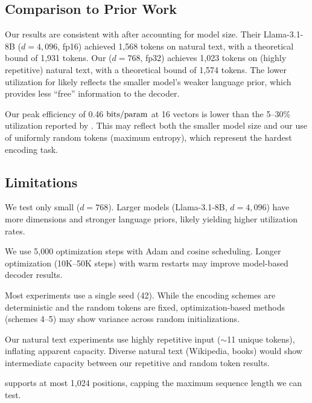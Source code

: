 \subsection{Comparison to Prior Work}

Our results are consistent with \citet{kuratov2025cramming} after accounting for model size. Their Llama-3.1-8B ($d = 4{,}096$, fp16) achieved 1,568 tokens on natural text, with a theoretical bound of 1,931 tokens. Our \gptwo ($d = 768$, fp32) achieves 1,023 tokens on (highly repetitive) natural text, with a theoretical bound of 1,574 tokens. The lower utilization for \gptwo likely reflects the smaller model's weaker language prior, which provides less ``free'' information to the decoder.

Our peak efficiency of 0.46 $\mathrm{bits/param}$ at 16 \memvec vectors is lower than the 5--30\% utilization reported by \citet{kuratov2025cramming}. This may reflect both the smaller model size and our use of uniformly random tokens (maximum entropy), which represent the hardest encoding task.

\subsection{Limitations}

 We test only \gptwo small ($d = 768$). Larger models (\eg Llama-3.1-8B, $d = 4{,}096$) have more dimensions and stronger language priors, likely yielding higher utilization rates.

 We use 5,000 optimization steps with Adam and cosine scheduling. Longer optimization (10K--50K steps) with warm restarts may improve model-based decoder results.

 Most experiments use a single seed (42). While the encoding schemes are deterministic and the random tokens are fixed, optimization-based methods (schemes 4--5) may show variance across random initializations.

 Our natural text experiments use highly repetitive input ($\sim$11 unique tokens), inflating apparent capacity. Diverse natural text (\eg Wikipedia, books) would show intermediate capacity between our repetitive and random token results.

 \gptwo supports at most 1,024 positions, capping the maximum sequence length we can test.
